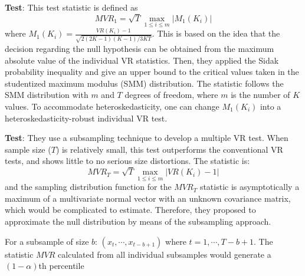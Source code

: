 \textbf{\citet{chow1993simple} Test}: This test statistic is defined as 
$$MVR_1=\sqrt{T}\max_{1\leq i \leq m}|M_1(K_i)|$$
where $M_1(K_i) = \frac{VR(K_i)-1}{\sqrt{2(2K-1)(K-1)/3KT}}$. This is based on the idea that the decision regarding the null hypothesis can be obtained from the maximum absolute value of
the individual VR statistics. Then, they applied the Sidak probability inequality and give an upper bound to the critical values taken in the studentized maximum modulus (SMM) distribution.
The statistic follows the SMM distribution with $m$ and $T$ degrees of freedom, where $m$ is the number of $K$ values. To accommodate heteroskedasticity, one can change $M_1(K_i)$ into 
a heteroskedasticity-robust individual VR test.

\textbf{\cite{whang2003multiple} Test}: They use a subsampling technique to develop a multiple VR test. When sample size ($T$) is relatively small, this test outperforms the conventional VR
tests, and shows little to no serious size distortions. The statistic is:
$$
MVR_T = \sqrt{T}\max_{1\leq i \leq m}|VR(K_i)-1|
$$
and the sampling distribution function for the $MVR_T$ statistic is asymptotically a maximum of a multivariate normal vector with an unknown covariance matrix, which would be complicated to
estimate. Therefore, they proposed to approximate the null distribution by means of the subsampling approach.

For a subsample of size $b$: $(x_t,\cdots,x_{t-b+1})$ where $t=1,\cdots,T-b+1$. The statistic $MVR$ calculated from all individual subsamples would generate a $(1-\alpha)$th percentile 